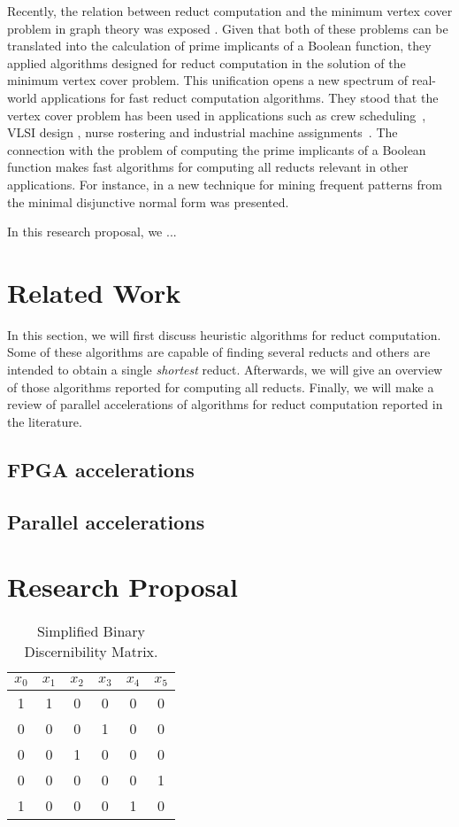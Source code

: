 \documentclass[citenumber]{elsarticle}
\begin{document}
	Recently, the relation between reduct computation and the minimum vertex cover problem in graph theory was exposed \cite{chen2015}. Given that both of these problems can be translated into the calculation of prime implicants of a Boolean function, they applied algorithms designed for reduct computation in the solution of the minimum vertex cover problem. This unification opens a new spectrum of real-world applications for fast reduct computation algorithms. They stood that the vertex cover problem has been used in applications such as crew scheduling~\cite{Sherali1984}, VLSI design \cite{Bhattacharyya2000}, nurse rostering \cite{Caprara1998} and industrial machine assignments~\cite{Woodyatt1993}. The connection with the problem of computing the prime implicants of a Boolean function makes fast algorithms for computing all reducts relevant in other applications. For instance, in \cite{Li2015} a new technique for mining frequent patterns from the minimal disjunctive normal form was presented.
	
	In this research proposal, we ...
%

\section{Related Work}\label{relatedWork}
  In this section, we will first discuss heuristic algorithms for reduct computation. Some of these algorithms are capable of finding several reducts and others are intended to obtain a single \textit{shortest} reduct. Afterwards, we will give an overview of those algorithms reported for computing all reducts. Finally, we will make a review of parallel accelerations of algorithms for reduct computation reported in the literature.    
%	
\subsection{FPGA accelerations}
%
  
%	
\subsection{Parallel accelerations}
%
	
%
\section{Research Proposal}  
%        
	\begin{table}[htb]
		\caption{Simplified Binary Discernibility Matrix.} \label{tab:SBDM}
		\centering
	 	\begin{tabular}{cccccc}
	 		$x_0$ & $x_1$ & $x_2$ & $x_3$ & $x_4$ & $x_5$ \\
	 		\hline
			1 & 1 & 0 & 0 & 0 & 0 \\
			0 & 0 & 0 & 1 & 0 & 0 \\
			0 & 0 & 1 & 0 & 0 & 0 \\
			0 & 0 & 0 & 0 & 0 & 1 \\
			1 & 0 & 0 & 0 & 1 & 0
	 	\end{tabular}             
 	\end{table}
 
\end{document}
